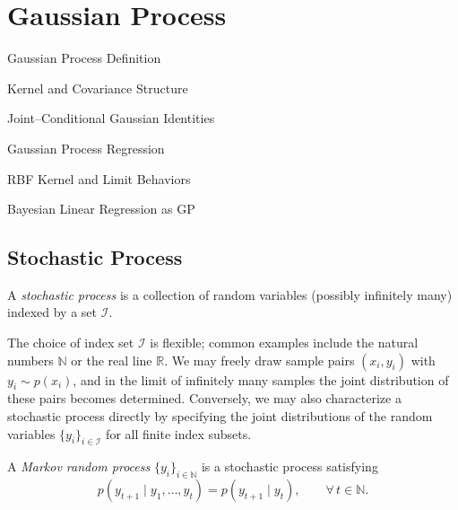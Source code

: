 \documentclass[../main]{subfiles}
\begin{document}
\chapter{Gaussian Process}
\begin{introduction}
    \item Gaussian Process Definition
    \item Kernel and Covariance Structure
    \item Joint–Conditional Gaussian Identities
    \item Gaussian Process Regression
    \item RBF Kernel and Limit Behaviors
    \item Bayesian Linear Regression as GP
\end{introduction}
\section{Stochastic Process}
\begin{definition}
    A \emph{stochastic process} is a collection of random variables
    (possibly infinitely many) indexed by a set $\mathcal{I}$.
\end{definition}

The choice of index set $\mathcal{I}$ is flexible; common examples include
the natural numbers $\mathbb{N}$ or the real line $\mathbb{R}$.  
We may freely draw sample pairs $(x_i, y_i)$ with $y_i \sim p(x_i)$, and in the limit of infinitely many samples the joint distribution of these pairs becomes determined.  
Conversely, we may also characterize a stochastic process directly by specifying the joint distributions of the random variables $\{y_i\}_{i\in\mathcal I}$ for all finite index subsets.

\begin{definition}
    A \emph{Markov random process} $\{y_i\}_{i\in\mathbb{N}}$ is a stochastic process satisfying
    \begin{equation}
        p(y_{t+1}\mid y_1,\dots,y_t)
        = p(y_{t+1}\mid y_t),
        \qquad \forall\, t\in\mathbb{N}.
    \end{equation}
\end{definition}
\end{document}
